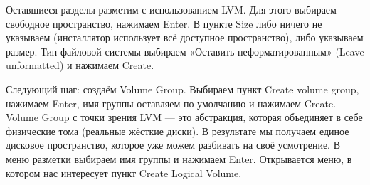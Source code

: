 \documentclass[14pt, a4paper]{article}
\begin{document}
Оставшиеся разделы разметим с использованием LVM. Для этого выбираем свободное
пространство, нажимаем Enter. В пункте Size либо ничего не указываем (инсталлятор использует всё
доступное пространство), либо указываем размер. Тип файловой системы выбираем «Оставить
неформатированным» (Leave unformatted) и нажимаем Create.

\begin{figure}[H]%
    \centering
    \label{1.7} %
\end{figure}

Следующий шаг: создаём Volume Group. Выбираем пункт Create volume group, нажимаем
Enter, имя группы оставляем по умолчанию и нажимаем Create. Volume Group с точки зрения LVM —
это абстракция, которая объединяет в себе физические тома (реальные жёсткие диски). В результате
мы получаем единое дисковое пространство, которое уже можем разбивать на своё усмотрение. В
меню разметки выбираем имя группы и нажимаем Enter. Открывается меню, в котором нас интересует
пункт Create Logical Volume.

\begin{figure}[h]%
    \centering
    \label{1.8} %
\end{figure}
\end{document}
